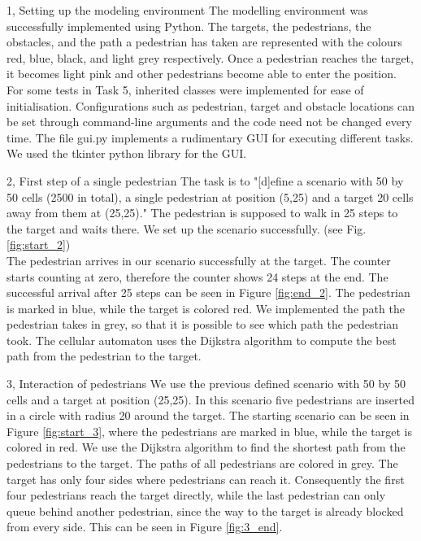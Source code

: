 \documentclass[10pt,a4paper]{article}
\begin{document}
\frontpage

\begin{task}{1, Setting up the modeling environment}
The modelling environment was successfully implemented using Python. The targets, the pedestrians, the obstacles, and the path a pedestrian has taken are represented with the colours red, blue, black, and light grey respectively. Once a pedestrian reaches the target, it becomes light pink and other pedestrians become able to enter the position. For some tests in Task 5, inherited classes were implemented for ease of initialisation. Configurations such as pedestrian, target and obstacle locations can be set through command-line arguments and the code need not be changed every time. The file gui.py implements a rudimentary GUI for executing different tasks. We used the tkinter python library for the GUI.
\end{task}
\begin{task}{2, First step of a single pedestrian}
The task is to "[d]efine a scenario with 50 by 50 cells (2500 in total), a single pedestrian at position (5,25) and a target 20 cells away from them at (25,25)." The pedestrian is supposed to walk in 25 steps to the target and waits there. We set up the scenario successfully. (see Fig. \ref{fig:start_2})\\
The pedestrian arrives in our scenario successfully at the target. The counter starts counting at zero, therefore the counter shows 24 steps at the end. The successful arrival after 25 steps can be seen in Figure \ref{fig:end_2}. The pedestrian is marked in blue, while the target is colored red. We implemented the path the pedestrian takes in grey, so that it is possible to see which path the pedestrian took. The cellular automaton uses the Dijkstra algorithm to compute the best path from the pedestrian to the target.
\end{task}
\begin{task}{3, Interaction of pedestrians}
We use the previous defined scenario with 50 by 50 cells and a target at position (25,25). In this scenario five pedestrians are inserted in a circle with radius 20 around the target. The starting scenario can be seen in Figure \ref{fig:start_3}, where the pedestrians are marked in blue, while the target is colored in red.
We use the Dijkstra algorithm to find the shortest path from the pedestrians to the target. The paths of all pedestrians are colored in grey. The target has only four sides where pedestrians can reach it. Consequently the first four pedestrians reach the target directly, while the last pedestrian can only queue behind another pedestrian, since the way to the target is already blocked from every side. This can be seen in Figure \ref{fig:3_end}.
\end{task}
\end{document}

